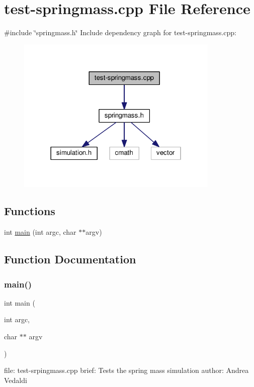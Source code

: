 \hypertarget{test-springmass_8cpp}{}\section{test-\/springmass.cpp File Reference}
\label{test-springmass_8cpp}
{\ttfamily \#include \char`\"{}springmass.\+h\char`\"{}}\newline
Include dependency graph for test-\/springmass.cpp\+:
\nopagebreak
\begin{figure}[H]
\begin{center}
\leavevmode
\includegraphics[width=274pt]{test-springmass_8cpp__incl}
\end{center}
\end{figure}
\subsection*{Functions}
\begin{DoxyCompactItemize}
\item 
int \hyperlink{test-springmass_8cpp_a3c04138a5bfe5d72780bb7e82a18e627}{main} (int argc, char $\ast$$\ast$argv)
\end{DoxyCompactItemize}


\subsection{Function Documentation}
\mbox{\label{test-springmass_8cpp_a3c04138a5bfe5d72780bb7e82a18e627}} 
\subsubsection{\texorpdfstring{main()}{main()}}
{\footnotesize\ttfamily int main (\begin{DoxyParamCaption}\item[{int}]{argc,  }\item[{char $\ast$$\ast$}]{argv }\end{DoxyParamCaption})}

file\+: test-\/srpingmass.\+cpp brief\+: Tests the spring mass simulation author\+: Andrea Vedaldi 